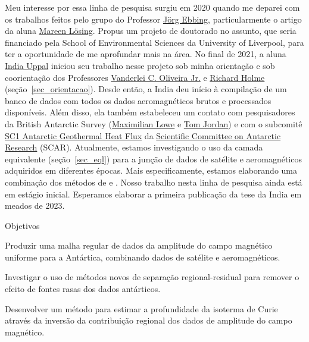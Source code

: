 \documentclass[12pt,a4paper,oneside]{book}
\newcommand{\UoL}{University of Liverpool}
\newcommand{\VanderleiLink}{\href{https://www.pinga-lab.org/people/oliveira-jr.html}{Vanderlei C. Oliveira Jr.}}
\newcommand{\IndiaLink}{\href{https://www.compgeolab.org/team/\#indiauppal}{India Uppal}}
\begin{document}
Meu interesse por essa linha de pesquisa surgiu em 2020 quando me deparei com
os trabalhos feitos pelo grupo do Professor
\href{https://www.satellitengeophysik.uni-kiel.de/de/mitarbeiter/joerg_ebbing}{Jörg Ebbing},
particularmente o artigo \citet{Losing2020} da aluna
\href{https://www.satellitengeophysik.uni-kiel.de/de/mitarbeiter/mareen_loesing}{Mareen Lösing}.
Propus um projeto de doutorado no assunto, que seria financiado pela School of
Environmental Sciences da \UoL{}, para ter a oportunidade de
me aprofundar mais na área.
No final de 2021, a aluna \IndiaLink{} iniciou seu trabalho nesse projeto sob
minha orientação e sob coorientação dos Professores \VanderleiLink{} e
\href{https://www.liverpool.ac.uk/~holme/}{Richard Holme}
(seção~\ref{sec_orientacao}).
Desde então, a India deu início à compilação de um banco de dados com todos os
dados aeromagnéticos brutos e processados disponíveis.
Além disso, ela também estabeleceu um contato com pesquisadores da
British Antarctic Survey (\href{https://www.bas.ac.uk/profile/maxwe32/}{Maximilian Lowe}
e \href{https://www.bas.ac.uk/profile/tomj/}{Tom Jordan})
e com o subcomitê \href{https://www.scar-instant.org/index.php/research-themes/theme-2-solid-earth-ice-interactions/sc1-antarctic-geothermal-heat-flux}{SC1 Antarctic Geothermal Heat Flux}
da \href{https://www.scar.org/}{Scientific Committee on Antarctic Research} (SCAR).
Atualmente, estamos investigando o uso da camada equivalente
(seção~\ref{sec_eql}) para a junção de dados de satélite e aeromagnéticos
adquiridos em diferentes épocas.
Mais especificamente, estamos elaborando uma combinação dos métodos de
\citet{Reis2020} e \citet{Soler2021}.
Nosso trabalho nesta linha de pesquisa ainda está em estágio inicial.
Esperamos elaborar a primeira publicação da tese da India em meados de 2023.


\begin{fancyenum}{\faBullseye}{Objetivos}
  \item Produzir uma malha regular de dados da amplitude do campo magnético
    uniforme para a Antártica, combinando dados de satélite e aeromagnéticos.
  \item Investigar o uso de métodos novos de separação regional-residual
    \citep[e.g.,][]{Florio2022} para remover o efeito de fontes rasas dos dados
    antárticos.
  \item Desenvolver um método para estimar a profundidade da isoterma de Curie
    através da inversão da contribuição regional dos dados de amplitude do
    campo magnético.
\end{fancyenum}
\end{document}
